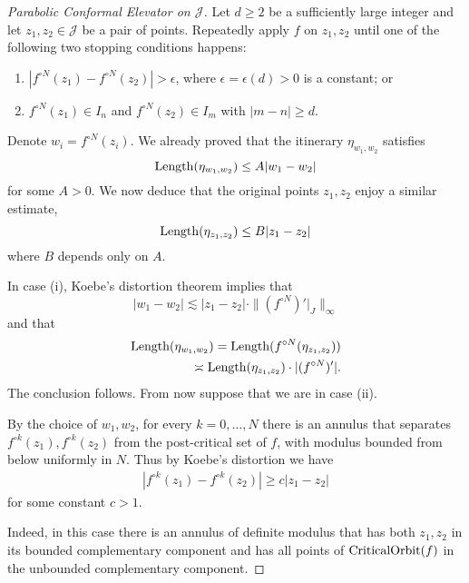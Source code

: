 \begin{proof}[Parabolic Conformal Elevator on $\mathcal J$] \label{parabolic-elevator}
Let $d\geq 2$ be a sufficiently large integer and let $z_1,z_2 \in \mathcal J$ be a pair of points. Repeatedly apply $f$ on $z_1,z_2$ until one of the following two stopping conditions happens:
\begin{enumerate}[label=\normalfont(\roman*)]
	\item $\left|f^{\circ N}(z_1)-f^{\circ N}(z_2)\right|>\epsilon$, where $\epsilon=\epsilon(d)>0$ is a constant;		
	or
	\item $f^{\circ N }(z_1) \in I_n$ and $f^{\circ N }(z_2) \in I_m$ with $|m-n| \geq d$.		
\end{enumerate}

Denote $w_i=f^{\circ N}(z_i)$. We already proved that the itinerary $\eta_{w_1,w_2}$ satisfies
\begin{equation*}
	\operatorname{Length}(\eta_{w_1,w_2}) \leq A |w_1-w_2|
\end{equation*}
for some $A>0$. We now deduce that the original points $z_1,z_2$ enjoy a similar estimate,
\begin{equation*}
	\operatorname{Length}(\eta_{z_1,z_2}) \leq B |z_1-z_2|
\end{equation*}
where $B$ depends only on $A$.
	
In case (i), Koebe's distortion theorem implies that
	\begin{equation*}
		|w_1-w_2| \lesssim |z_1-z_2| \cdot \|(f^{\circ N})'|_{J}\|_{\infty}
	\end{equation*}
	and that
	\begin{align*}
		\operatorname{Length} (\eta_{w_1,w_2}) = \operatorname{Length}(f^{\circ N}(\eta_{z_1,z_2})) \\
		\asymp \operatorname{Length}(\eta_{z_1,z_2}) \cdot |(f^{\circ N})'|.
	\end{align*}
	The conclusion follows. From now suppose that we are in case (ii).

By the choice of $w_1,w_2$, for every $k=0,\dots,N$ there is an annulus that separates $f^{\circ k}(z_1),f^{\circ k}(z_2)$ from the post-critical set of $f$, with modulus bounded from below uniformly in $N$.
Thus by Koebe's distortion we have 
\begin{align*}
|f^{\circ k}(z_1)-f^{\circ k}(z_2)|\geq c |z_1-z_2|
\end{align*}
for some constant $c>1$.

Indeed, in this case there is an annulus of definite modulus that has both $z_1,z_2$ in its bounded complementary component and has all points of $\operatorname{CriticalOrbit}(f)$ in the unbounded complementary component.


\end{proof}
